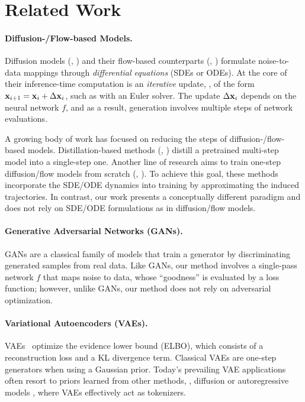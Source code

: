 \section{Related Work}

\paragraph{Diffusion-/Flow-based Models.}
Diffusion models (\eg, \citealt{sohl2015deep,ho2020denoising,song2020score}) and their flow-based counterparts (\eg, \citealt{lipman2022flow,liu2022flow,albergo2023stochastic}) formulate noise-to-data mappings through \textit{differential equations} (SDEs or ODEs). At the core of their inference-time computation is an \textit{\mbox{iterative}} update, \eg, of the form $\mathbf{x}_{i+1}=\mathbf{x}_{i} + \Delta\mathbf{x}_{i}$, such as with an Euler solver. The update $\Delta\mathbf{x}_{i}$ depends on the neural network $f$, and as a result, generation involves multiple steps of network evaluations.

A growing body of work has focused on reducing the steps of diffusion-/flow-based models.
Distillation-based methods 
(\eg, \citealt{salimans2022progressive,luo2023diff,yin2024one,zhou2024score}) distill a pretrained multi-step model into a single-step one.
Another line of research  aims to train one-step diffusion/flow models from scratch (\eg, \citealt{song2023consistency,frans2024one,boffi2025flow,geng2025mean}). To achieve this goal, these methods incorporate the SDE/ODE dynamics into training by approximating the induced trajectories.
In contrast, our work presents a conceptually different paradigm and does not rely on SDE/ODE formulations as in diffusion/flow models.

\paragraph{Generative Adversarial Networks (GANs).}
GANs \cite{goodfellow2014generative} are a classical family of models that train a generator by discriminating generated samples from real data.
Like GANs, our method involves a single-pass network $f$ that maps noise to data, whose ``goodness'' is evaluated by a loss function; however, unlike GANs, our method does not rely on adversarial optimization.

\paragraph{Variational Autoencoders (VAEs).}
VAEs~\cite{kingma2013auto} optimize the evidence lower bound (ELBO), which consists of a reconstruction loss and a KL divergence term.
Classical VAEs are one-step generators when using a Gaussian prior. Today's prevailing VAE applications often resort to priors learned from other methods, \eg, diffusion \cite{rombach2022high} or autoregressive models \cite{esser2021taming}, where VAEs effectively act as tokenizers.

